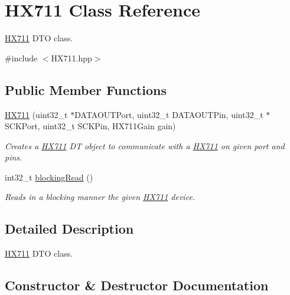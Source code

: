 \hypertarget{class_h_x711}{}\section{H\+X711 Class Reference}
\label{class_h_x711}


\hyperlink{class_h_x711}{H\+X711} D\+TO class.  




{\ttfamily \#include $<$H\+X711.\+hpp$>$}

\subsection*{Public Member Functions}
\begin{DoxyCompactItemize}
\item 
\hyperlink{class_h_x711_a4811851fedcc143ef8c5a167bf6d0a27}{H\+X711} (uint32\+\_\+t $\ast$D\+A\+T\+A\+O\+U\+T\+Port, uint32\+\_\+t D\+A\+T\+A\+O\+U\+T\+Pin, uint32\+\_\+t $\ast$S\+C\+K\+Port, uint32\+\_\+t S\+C\+K\+Pin, H\+X711\+Gain gain)
\begin{DoxyCompactList}\small\item\em Creates a \hyperlink{class_h_x711}{H\+X711} DT object to communicate with a \hyperlink{class_h_x711}{H\+X711} on given port and pins. \end{DoxyCompactList}\item 
int32\+\_\+t \hyperlink{class_h_x711_ad6b33f180186020d4625d7b0653683da}{blocking\+Read} ()
\begin{DoxyCompactList}\small\item\em Reads in a blocking manner the given \hyperlink{class_h_x711}{H\+X711} device. \end{DoxyCompactList}\end{DoxyCompactItemize}


\subsection{Detailed Description}
\hyperlink{class_h_x711}{H\+X711} D\+TO class. 

\subsection{Constructor \& Destructor Documentation}
\mbox{\label{class_h_x711_a4811851fedcc143ef8c5a167bf6d0a27}} 
